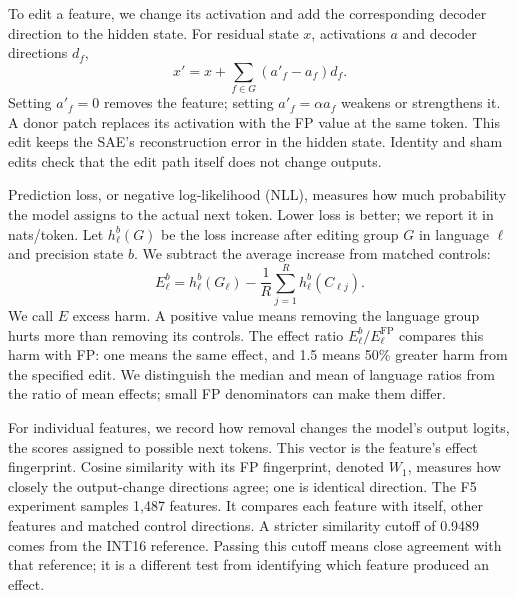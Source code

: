 \documentclass[11pt]{article}
\newcommand{\FP}{\mathrm{FP}}
\begin{document}
To edit a feature, we change its activation and add the corresponding decoder direction to the hidden state. For residual state $x$, activations $a$ and decoder directions $d_f$,
\begin{equation}
 x'=x+\sum_{f\in G}(a'_f-a_f)d_f.\label{eq:edit}
\end{equation}
Setting $a'_f=0$ removes the feature; setting $a'_f=\alpha a_f$ weakens or strengthens it. A donor patch replaces its activation with the FP value at the same token. This edit keeps the SAE's reconstruction error in the hidden state. Identity and sham edits check that the edit path itself does not change outputs.

Prediction loss, or negative log-likelihood (NLL), measures how much probability the model assigns to the actual next token. Lower loss is better; we report it in nats/token. Let $h_\ell^b(G)$ be the loss increase after editing group $G$ in language $\ell$ and precision state $b$. We subtract the average increase from matched controls:
\begin{equation}
 E_\ell^b=h_\ell^b(G_\ell)-\frac{1}{R}\sum_{j=1}^{R}h_\ell^b(C_{\ell j}).\label{eq:net}
\end{equation}
We call $E$ excess harm. A positive value means removing the language group hurts more than removing its controls. The effect ratio $E_\ell^b/E_\ell^\FP$ compares this harm with FP: one means the same effect, and 1.5 means 50\% greater harm from the specified edit. We distinguish the median and mean of language ratios from the ratio of mean effects; small FP denominators can make them differ.

For individual features, we record how removal changes the model's output logits, the scores assigned to possible next tokens. This vector is the feature's effect fingerprint. Cosine similarity with its FP fingerprint, denoted $W_1$, measures how closely the output-change directions agree; one is identical direction. The F5 experiment samples 1,487 features. It compares each feature with itself, other features and matched control directions. A stricter similarity cutoff of 0.9489 comes from the INT16 reference. Passing this cutoff means close agreement with that reference; it is a different test from identifying which feature produced an effect.
\end{document}

